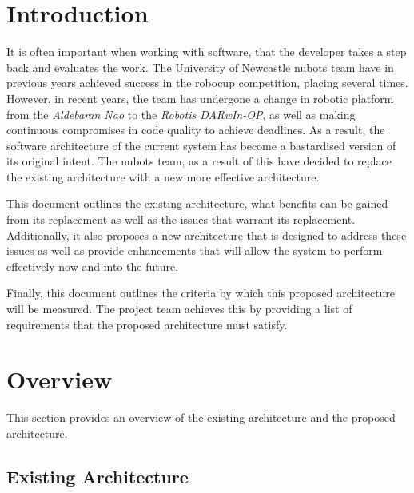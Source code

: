 \documentclass[english,12pt]{scrartcl}
\begin{document}
	\clearpage
		
	\section{Introduction}
		It is often important when working with software, that the developer takes a step back and evaluates the work.
		The University of Newcastle \gls{nubots} team have in previous years achieved success in the \gls{robocup} competition, placing several times.
		However, in recent years, the team has undergone a change in robotic platform from the \emph{Aldebaran Nao} to the \emph{Robotis DARwIn-OP}, as well as making continuous compromises in code quality to achieve deadlines.
		As a result, the software architecture of the current system has become a bastardised version of its original intent.
		The \gls{nubots} team, as a result of this have decided to replace the existing architecture with a new more effective architecture.
		
		This document outlines the existing architecture, what benefits can be gained from its replacement as well as the issues that warrant its replacement.
		Additionally, it also proposes a new architecture that is designed to address these issues as well as provide enhancements that will allow the system to perform effectively now and into the future.
		
		Finally, this document outlines the criteria by which this proposed architecture will be measured. The project team achieves this by providing a list of requirements that the proposed architecture must satisfy.

	\section{Overview}
		This section provides an overview of the existing architecture and the proposed architecture.

		\subsection{Existing Architecture}
\end{document}
